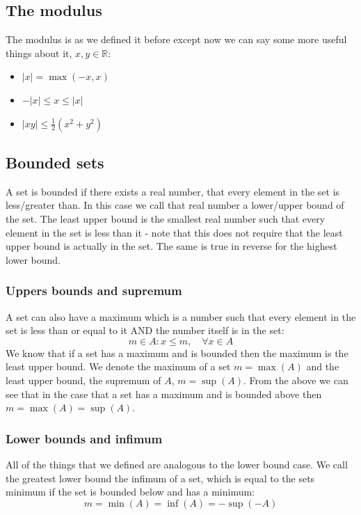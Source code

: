 \documentclass[12pt]{article}
\begin{document}
\subsection*{The modulus}
The modulus is as we defined it before except now we can say some more useful things about it, \(x,y\in\mathbb{R}\):
\begin{itemize}
    \item \(\vert x\vert=\max(-x,x)\)
    \item \(-\vert x\vert\leq x \leq \vert x\vert\)
    \item \(\vert xy\vert\leq\frac{1}{2}(x^2+y^2)\)
\end{itemize}
\subsection*{Bounded sets}
A set is bounded if there exists a real number, that every element in the set is less/greater than. In this case we call that real number a lower/upper bound of the set. The least upper bound is the smallest real number such that every element in the set is less than it - note that this does not require that the least upper bound is actually in the set. The same is true in reverse for the highest lower bound.
\subsubsection*{Uppers bounds and supremum}
A set can also have a maximum which is a number such that every element in the set is less than or equal to it AND the number itself is in the set:
\[m\in A:x\leq m,\quad\forall x\in A\]
We know that if a set has a maximum and is bounded then the maximum is the least upper bound. We denote the maximum of a set \(m=\max(A)\) and the least upper bound, the supremum of \(A\), \(m=\sup(A)\). From the above we can see that in the case that a set has a maximum and is bounded above then \(m=\max(A)=\sup(A)\).
\subsubsection*{Lower bounds and infimum}
All of the things that we defined are analogous to the lower bound case. We call the greatest lower bound the infimum of a set, which is equal to the sets minimum if the set is bounded below and has a minimum:
\[m=\min(A)=\inf(A)=-\sup(-A)\]
\end{document}
